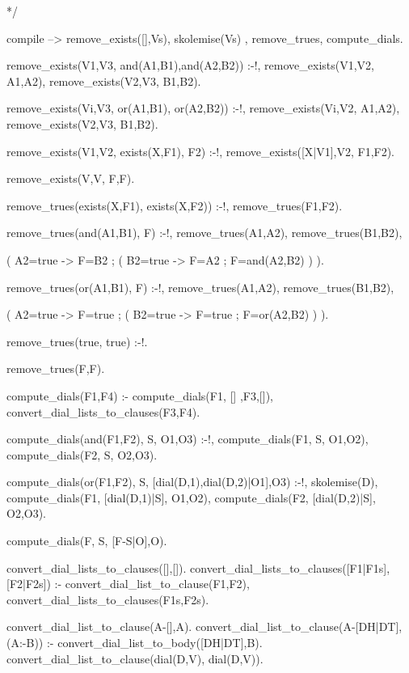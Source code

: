\documentclass{book}[9pt]
\newenvironment{code}%
{\small \verbatim}%
{\endverbatim \large}
\begin{document}
\begin{code}
*/

compile -->
       remove_exists([],Vs),
       { skolemise(Vs) },
       remove_trues,
       compute_dials.

remove_exists(V1,V3, and(A1,B1),and(A2,B2)) :-!, 
       remove_exists(V1,V2, A1,A2),
       remove_exists(V2,V3, B1,B2).

remove_exists(Vi,V3, or(A1,B1), or(A2,B2))  :-!, 
       remove_exists(Vi,V2, A1,A2),
       remove_exists(V2,V3, B1,B2).

remove_exists(V1,V2, exists(X,F1), F2) :-!,
       remove_exists([X|V1],V2, F1,F2).

remove_exists(V,V, F,F).

        
remove_trues(exists(X,F1), exists(X,F2)) :-!,
       remove_trues(F1,F2).
      
remove_trues(and(A1,B1), F) :-!,
       remove_trues(A1,A2),
       remove_trues(B1,B2),

       ( A2=true
       -> F=B2
       ; ( B2=true
         -> F=A2
         ; F=and(A2,B2)
         )
       ).

remove_trues(or(A1,B1), F) :-!,
        remove_trues(A1,A2),
        remove_trues(B1,B2),
        
        ( A2=true
        -> F=true
        ;  ( B2=true
           -> F=true
           ; F=or(A2,B2)
           )
        ).

remove_trues(true, true) :-!.

remove_trues(F,F).


compute_dials(F1,F4) :-
        compute_dials(F1, [] ,F3,[]),
        convert_dial_lists_to_clauses(F3,F4).

compute_dials(and(F1,F2), S,  O1,O3) :-!,
        compute_dials(F1, S, O1,O2),
        compute_dials(F2, S, O2,O3).
        
compute_dials(or(F1,F2), S,  [dial(D,1),dial(D,2)|O1],O3) :-!,
        skolemise(D),
        compute_dials(F1, [dial(D,1)|S], O1,O2),
        compute_dials(F2, [dial(D,2)|S], O2,O3).

compute_dials(F, S, [F-S|O],O).


        
convert_dial_lists_to_clauses([],[]).
convert_dial_lists_to_clauses([F1|F1s],[F2|F2s]) :-
        convert_dial_list_to_clause(F1,F2),
        convert_dial_lists_to_clauses(F1s,F2s).
        
convert_dial_list_to_clause(A-[],A).
convert_dial_list_to_clause(A-[DH|DT],(A:-B)) :-
        convert_dial_list_to_body([DH|DT],B).
convert_dial_list_to_clause(dial(D,V), dial(D,V)).



\end{code}
\end{document}
